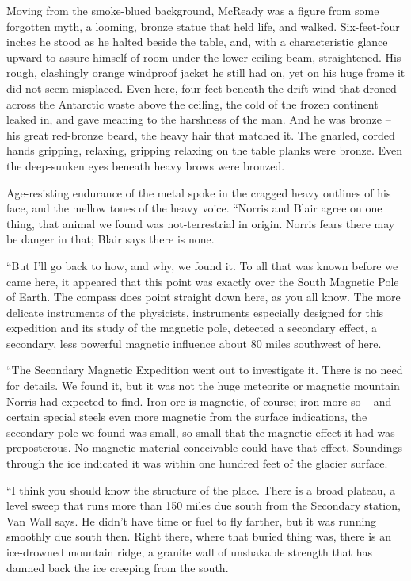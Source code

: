 \documentclass[ebook,oneside,11pt]{memoir}				%
\begin{document}
Moving from the smoke-blued background, McReady was a figure from some forgotten myth, a looming, bronze statue that held life, and walked. Six-feet-four inches he stood as he halted beside the table, and, with a characteristic glance upward to assure himself of room under the lower ceiling beam, straightened. His rough, clashingly orange windproof jacket he still had on, yet on his huge frame it did not seem misplaced. Even here, four feet beneath the drift-wind that droned across the Antarctic waste above the ceiling, the cold of the frozen continent leaked in, and gave meaning to the harshness of the man. And he was bronze – his great red-bronze beard, the heavy hair that matched it. The gnarled, corded hands gripping, relaxing, gripping relaxing on the table planks were bronze. Even the deep-sunken eyes beneath heavy brows were bronzed.

Age-resisting endurance of the metal spoke in the cragged heavy outlines of his face, and the mellow tones of the heavy voice. ``Norris and Blair agree on one thing, that animal we found was not-terrestrial in origin. Norris fears there may be danger in that; Blair says there is none.

``But I'll go back to how, and why, we found it. To all that was known before we came here, it appeared that this point was exactly over the South Magnetic Pole of Earth. The compass does point straight down here, as you all know. The more delicate instruments of the physicists, instruments especially designed for this expedition and its study of the magnetic pole, detected a secondary effect, a secondary, less powerful magnetic influence about 80 miles southwest of here.

``The Secondary Magnetic Expedition went out to investigate it. There is no need for details. We found it, but it was not the huge meteorite or magnetic mountain Norris had expected to find. Iron ore is magnetic, of course; iron more so -- and certain special steels even more magnetic from the surface indications, the secondary pole we found was small, so small that the magnetic effect it had was preposterous. No magnetic material conceivable could have that effect. Soundings through the ice indicated it was within one hundred feet of the glacier surface.

``I think you should know the structure of the place. There is a broad plateau, a level sweep that runs more than 150 miles due south from the Secondary station, Van Wall says. He didn't have time or fuel to fly farther, but it was running smoothly due south then. Right there, where that buried thing was, there is an ice-drowned mountain ridge, a granite wall of unshakable strength that has damned back the ice creeping from the south.
\end{document}
